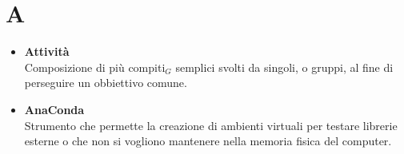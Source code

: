 \chapter{A} \label{A}
\begin{itemize}
		\item \textbf{Attività}\\
		Composizione di più compiti$_G$ semplici svolti da singoli, o gruppi, al fine di perseguire un obbiettivo comune.
		
		\item \textbf{AnaConda}\\
		Strumento che permette la creazione di ambienti virtuali per testare librerie esterne o che non si vogliono mantenere nella memoria fisica del computer.
	\end{itemize}